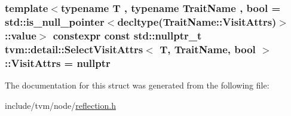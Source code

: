 \subsubsection[{\texorpdfstring{Visit\+Attrs}{VisitAttrs}}]{\setlength{\rightskip}{0pt plus 5cm}template$<$typename T , typename Trait\+Name , bool  = std\+::is\+\_\+null\+\_\+pointer$<$decltype(\+Trait\+Name\+::\+Visit\+Attrs)$>$\+::value$>$ constexpr const std\+::nullptr\+\_\+t {\bf tvm\+::detail\+::\+Select\+Visit\+Attrs}$<$ T, Trait\+Name, bool $>$\+::Visit\+Attrs = nullptr\hspace{0.3cm}{\ttfamily [static]}}\hypertarget{structtvm_1_1detail_1_1SelectVisitAttrs_aacd15172d6c63d2008e1d109530d174f}{}\label{structtvm_1_1detail_1_1SelectVisitAttrs_aacd15172d6c63d2008e1d109530d174f}


The documentation for this struct was generated from the following file\+:\begin{DoxyCompactItemize}
\item 
include/tvm/node/\hyperlink{reflection_8h}{reflection.\+h}\end{DoxyCompactItemize}
